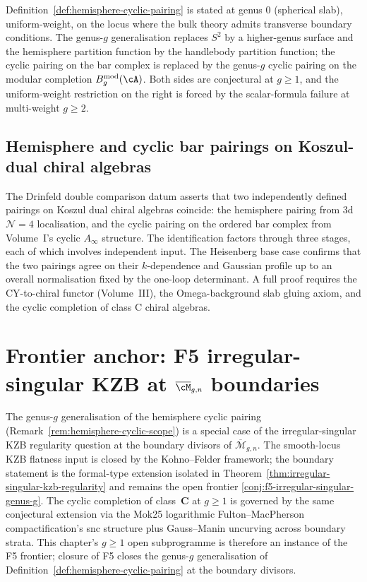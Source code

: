 \begin{remark}[Scope]
\label{rem:hemisphere-cyclic-scope}
Definition~\ref{def:hemisphere-cyclic-pairing} is stated at
genus $0$ (spherical slab), uniform-weight, on the locus
where the bulk theory admits transverse boundary conditions.
The genus-$g$ generalisation replaces $S^2$ by a higher-genus
surface and the hemisphere partition function by the handlebody
partition function; the cyclic pairing on the bar complex is
replaced by the genus-$g$ cyclic pairing on the modular
completion $B^{\mathrm{mod}}_g(\cA)$. Both sides are
conjectural at $g\ge 1$, and the uniform-weight restriction on
the right is forced by the scalar-formula failure at multi-weight
$g\ge 2$.
\end{remark}

\subsection{Hemisphere and cyclic bar pairings on Koszul-dual chiral algebras}
\label{subsec:hemisphere-cyclic-summary}

The Drinfeld double comparison datum asserts that two independently
defined pairings on Koszul dual chiral algebras coincide: the
hemisphere pairing from $3$d $\mathcal N=4$ localisation, and
the cyclic pairing on the ordered bar complex from Volume~I's
cyclic $A_\infty$ structure. The identification factors
through three stages, each of which involves independent input.
The Heisenberg base case confirms that the two pairings agree
on their $k$-dependence and Gaussian profile up to an overall
normalisation fixed by the one-loop determinant. A full proof
requires the CY-to-chiral functor (Volume~III), the
Omega-background slab gluing axiom, and the cyclic completion
of class C chiral algebras.

\section{Frontier anchor: F5 irregular-singular KZB at $\overline{\cM}_{g,n}$ boundaries}
\label{sec:modular-pva-frontier-anchor-f5}

The genus-$g$ generalisation of the hemisphere cyclic pairing
(Remark~\ref{rem:hemisphere-cyclic-scope}) is a special case of
the irregular-singular KZB regularity question at the boundary
divisors of $\overline{\mathcal{M}}_{g, n}$. The smooth-locus
KZB flatness input is closed by the Kohno--Felder framework; the
boundary statement is the formal-type extension isolated in
Theorem~\ref{thm:irregular-singular-kzb-regularity} and remains
the open frontier
\cref{conj:f5-irregular-singular-genus-g}. The cyclic completion
of class~$\mathbf{C}$ at
$g \ge 1$ is governed by the same conjectural extension via the
Mok25 logarithmic Fulton--MacPherson compactification's snc
structure plus Gauss--Manin uncurving across boundary strata.
This chapter's $g \ge 1$ open subprogramme is therefore an
instance of the F5 frontier; closure of F5 closes the
genus-$g$ generalisation of
Definition~\ref{def:hemisphere-cyclic-pairing} at the
boundary divisors.

